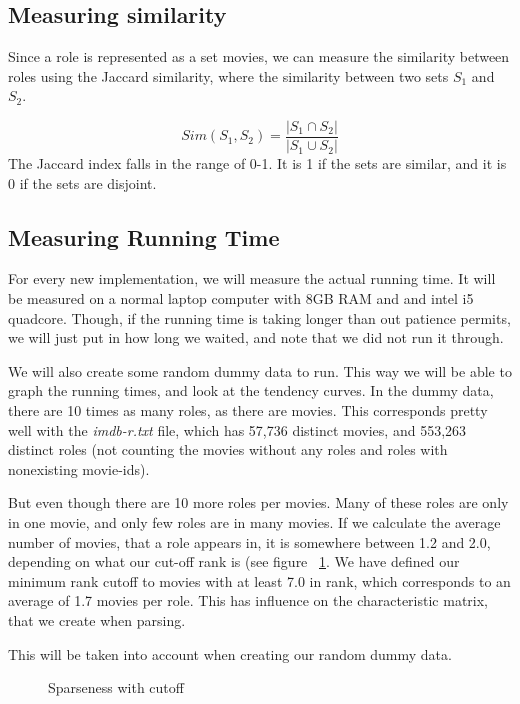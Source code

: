 \documentclass[a4paper,11pt]{article}
\begin{document}
\subsection{Measuring similarity}
Since a role is represented as a set movies, we can measure the similarity between roles using the Jaccard similarity, where the similarity between two sets $S_1$ and $S_2$.

\begin{equation}
Sim(S_1, S_2) = \frac{|S_1 \cap S_2|}{|S_1 \cup S_2|}
\end{equation}
The Jaccard index falls in the range of 0-1. It is 1 if the sets are similar, and it is 0 if the sets are disjoint.


\subsection{Measuring Running Time}
For every new implementation, we will measure the actual running time. It will be measured on a normal laptop computer with 8GB RAM and and intel i5 quadcore. Though, if the running time is taking longer than out patience permits, we will just put in how long we waited, and note that we did not run it through.

We will also create some random dummy data to run. This way we will be able to graph the running times, and look at the tendency curves. In the dummy data, there are 10 times as many roles, as there are movies. This corresponds pretty well with the \emph{imdb-r.txt} file, which has 57,736 distinct movies, and 553,263 distinct roles (not counting the movies without any roles and roles with nonexisting movie-ids).

But even though there are 10 more roles per movies. Many of these roles are only in one movie, and only few roles are in many movies. If we calculate the average number of movies, that a role appears in, it is somewhere between 1.2 and 2.0, depending on what our cut-off rank is (see figure ~\ref{fig:sparsenesscutoff}. We have defined our minimum rank cutoff to movies with at least 7.0 in rank, which corresponds to an average of 1.7 movies per role. This has influence on the characteristic matrix, that we create when parsing.

This will be taken into account when creating our random dummy data.

\begin{figure}[!htbp]
    \begin{center}
        
        \caption{Sparseness with cutoff}
        \label{fig:sparsenesscutoff}
    \end{center}
\end{figure}
\end{document}
